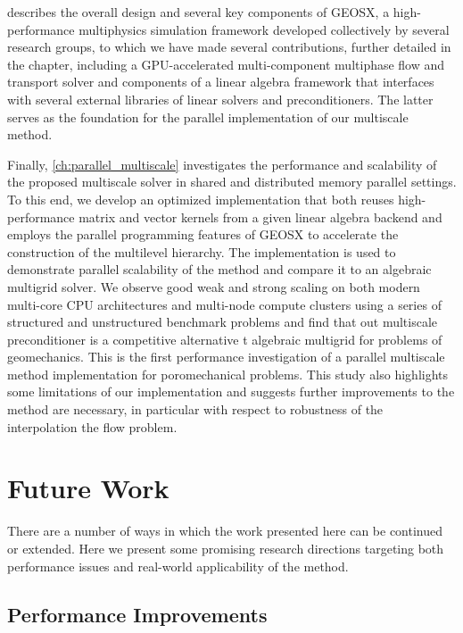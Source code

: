  describes the overall design and several key components of GEOSX, a high-performance multiphysics simulation framework developed collectively by several research groups, to which we have made several contributions, further detailed in the chapter, including a GPU-accelerated multi-component multiphase flow and transport solver and components of a linear algebra framework that interfaces with several external libraries of linear solvers and preconditioners.   The latter serves as the foundation for the parallel implementation of our multiscale method.

Finally, \cref{ch:parallel_multiscale} investigates the performance and scalability of the proposed multiscale solver in shared and distributed memory parallel settings.   To this end, we develop an optimized implementation that both reuses high-performance matrix and vector kernels from a given linear algebra backend and employs the parallel programming features of GEOSX to accelerate the construction of the multilevel hierarchy.   The implementation is used to demonstrate parallel scalability of the method and compare it to an algebraic multigrid solver.   We observe good weak and strong scaling on both modern multi-core CPU architectures and multi-node compute clusters using a series of structured and unstructured benchmark problems and find that out multiscale preconditioner is a competitive alternative t algebraic multigrid for problems of geomechanics.   This is the first performance investigation of a parallel multiscale method implementation for poromechanical problems.   This study also highlights some limitations of our implementation and suggests further improvements to the method are necessary, in particular with respect to robustness of the interpolation the flow problem.

\section{Future Work}

There are a number of ways in which the work presented here can be continued or extended.   Here we present some promising research directions targeting both performance issues and real-world applicability of the method.

\subsection{Performance Improvements}

